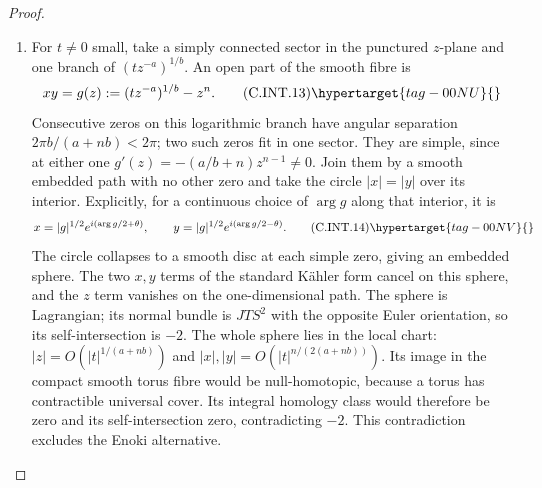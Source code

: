 \begin{proof}
\begin{enumerate}[label=\arabic*.,leftmargin=*]
\item For $t\ne0$ small, take a simply connected
sector in the punctured $z$-plane and one
branch of $(t z^{-a})^{1/b}$. An open part
of the smooth fibre is
\[
 xy=g(z):=(t z^{-a})^{1/b}-z^n.
 \tag{C.INT.13}\hypertarget{tag-00NU}{}\label{cdp:eq:C.INT.13}
\]
Consecutive zeros on this logarithmic branch
have angular separation $2\pi b/(a+nb)<2\pi$;
two such zeros fit in one sector. They are
simple, since at either one
$g'(z)=-(a/b+n)z^{n-1}\ne0$.
Join them by a smooth embedded path with no
other zero and take the circle $|x|=|y|$
over its interior. Explicitly, for a continuous
choice of $\arg g$ along that interior, it is
\[
 x=|g|^{1/2}e^{i(\arg g/2+\theta)},\qquad
 y=|g|^{1/2}e^{i(\arg g/2-\theta)}.
 \tag{C.INT.14}\hypertarget{tag-00NV}{}\label{cdp:eq:C.INT.14}
\]
The circle collapses to a smooth disc at each
simple zero, giving an embedded sphere.
The two $x,y$ terms of the standard K\"ahler
form cancel on this sphere, and the $z$ term
vanishes on the one-dimensional path. The
sphere is Lagrangian; its normal bundle is
$JTS^2$ with the opposite Euler orientation,
so its self-intersection is $-2$.
The whole sphere lies in the local chart:
$|z|=O(|t|^{1/(a+nb)})$ and
$|x|,|y|=O(|t|^{n/(2(a+nb))})$.
Its image in the compact smooth torus fibre
would be null-homotopic, because a torus has
contractible universal cover. Its integral
homology class would therefore be zero and
its self-intersection zero, contradicting
$-2$. This contradiction excludes the Enoki
alternative.

\end{enumerate}
\end{proof}